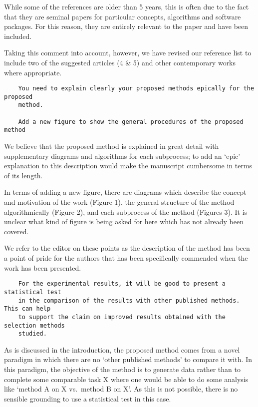 \documentclass[11pt]{article}
\begin{document}
While some of the references are older than 5 years, this is often due to the
fact that they are seminal papers for particular concepts, algorithms and
software packages. For this reason, they are entirely relevant to the paper and
have been included.

Taking this comment into account, however, we have revised our reference list to
include two of the suggested articles (4 \& 5) and other contemporary works
where appropriate.\\

\begin{tcolorbox}
\begin{verbatim}
    You need to explain clearly your proposed methods epically for the proposed
    method.

    Add a new figure to show the general procedures of the proposed method
\end{verbatim}
\end{tcolorbox}

We believe that the proposed method is explained in great detail with
supplementary diagrams and algorithms for each subprocess; to add an `epic'
explanation to this description would make the manuscript cumbersome in terms of
its length.

In terms of adding a new figure, there are diagrams which describe the concept
and motivation of the work (Figure 1), the general structure of the method
algorithmically (Figure 2), and each subprocess of the method (Figures 3).
It is unclear what kind of figure is being asked for here which has not already
been covered.

We refer to the editor on these points as the description of the method has been
a point of pride for the authors that has been specifically commended when the
work has been presented.\\

\begin{tcolorbox}
\begin{verbatim}
    For the experimental results, it will be good to present a statistical test
    in the comparison of the results with other published methods. This can help
    to support the claim on improved results obtained with the selection methods
    studied.
\end{verbatim}
\end{tcolorbox}

As is discussed in the introduction, the proposed method comes from a novel
paradigm in which there are no `other published methods' to compare it with. In
this paradigm, the objective of the method is to generate data rather than to
complete some comparable task X where one would be able to do some analysis like
`method A on X vs.\ method B on X'. As this is not possible, there is no
sensible grounding to use a statistical test in this case.\\
\end{document}
